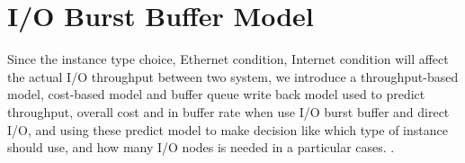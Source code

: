 \section{I/O Burst Buffer Model}
\label{sec:model}

Since the instance type choice, Ethernet condition, Internet condition will affect the actual I/O throughput between two system, we introduce a throughput-based model, cost-based model and buffer queue write back model used to predict throughput, overall cost and in buffer rate when use I/O burst buffer and direct I/O, and using these predict model to make decision like which type of instance should use, and how many I/O nodes is needed in a particular cases.
.

